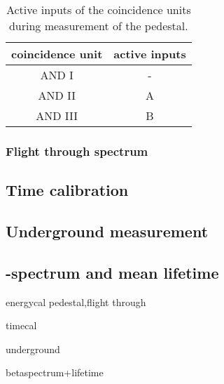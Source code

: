 \begin{table}[H]
\caption{Active inputs of the coincidence units during measurement of the pedestal.}
\begin{center}
\begin{tabular}{|c|c|}
  \hline
  coincidence unit	& active inputs	\\ \hline
  AND I				& -				\\ \hline
  AND II			& A				\\ \hline
  AND III			& B				\\ \hline
 \end{tabular}
\end{center}
\label{tab:condped}
\end{table}

\subsubsection{Flight through spectrum}


\subsection{Time calibration}


\subsection{Underground measurement}

\subsection{\textbeta-spectrum and mean lifetime}


energycal
pedestal,flight through

timecal

underground

betaspectrum+lifetime
